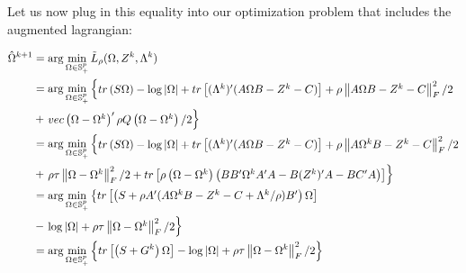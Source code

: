 \documentclass[11pt,]{report}
\theoremstyle{definition}
\theoremstyle{definition}
\theoremstyle{definition}
\theoremstyle{remark}
\begin{document}
Let us now plug in this equality into our optimization problem that includes the augmented lagrangian:

\begin{equation}
\begin{split}
  \hat{\Omega}^{k + 1} &= \arg\min_{\Omega \in \mathbb{S}_{+}^{p}}\tilde{L}_{\rho}(\Omega, Z^{k}, \Lambda^{k}) \\
  &= \arg\min_{\Omega \in \mathbb{S}_{+}^{p}}\left\{\begin{matrix}
 tr\left(S\Omega\right) - \log\left|\Omega\right| + tr\left[(\Lambda^{k})'(A\Omega B - Z^{k} - C) \right] + \rho\left\|A\Omega B - Z^{k} - C \right\|_{F}^{2}/2 \end{matrix}\right. \\
  &+ \left.\begin{matrix} vec\left(\Omega - \Omega^{k}\right)'\rho Q\left(\Omega - \Omega^{k}\right)/2 \end{matrix}\right\} \\
  &= \arg\min_{\Omega \in \mathbb{S}_{+}^{p}}\left\{\begin{matrix}
 tr\left(S\Omega\right) - \log\left|\Omega\right| + tr\left[(\Lambda^{k})'(A\Omega B - Z^{k} - C) \right] + \rho\left\|A\Omega^{k} B - Z^{k} - C \right\|_{F}^{2}/2 \end{matrix}\right. \\
  &+ \left.\begin{matrix} \rho\tau\left\|\Omega - \Omega^{k}\right\|_{F}^{2}/2 + tr\left[\rho\left(\Omega - \Omega^{k}\right)\left(BB'\Omega^{k}A'A - B(Z^{k})'A - BC'A \right)\right] \end{matrix}\right\} \\
  &= \arg\min_{\Omega \in \mathbb{S}_{+}^{p}}\left\{\begin{matrix}
 tr\left[\left(S + \rho A'(A\Omega^{k}B - Z^{k} - C + \Lambda^{k}/\rho)B' \right)\Omega\right] \end{matrix}\right. \\
  &- \left.\begin{matrix} \log\left|\Omega\right| + \rho\tau\left\|\Omega - \Omega^{k}\right\|_{F}^{2}/2 \end{matrix}\right\} \\
  &= \arg\min_{\Omega \in \mathbb{S}_{+}^{p}}\left\{
 tr\left[\left(S + G^{k} \right)\Omega\right] - \log\left|\Omega\right| + \rho\tau\left\|\Omega - \Omega^{k}\right\|_{F}^{2}/2 \right\} \\
\label{eq:omegaapprox}\notag
\end{split}
\end{equation}
\end{document}
